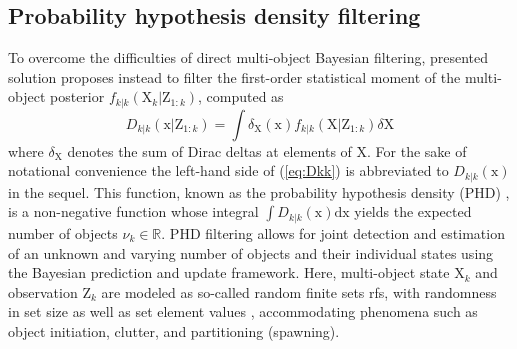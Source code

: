 \subsection{Probability hypothesis density filtering}
\label{ssec:prob-hyp-den}
To overcome the difficulties of direct multi-object Bayesian filtering, presented solution proposes instead to filter the first-order statistical moment of the multi-object posterior $f_{k|k}(\mathrm{X}_{k}|\mathrm{Z}_{1:k})$, computed as
\begin{equation}
D_{k|k}(\mathrm{x}|\mathrm{Z}_{1:k}) = \int\!\delta_{\mathrm{X}}(\mathrm{x})f_{k|k}(\mathrm{X}|\mathrm{Z}_{1:k})\delta\mathrm{X}
\label{eq:Dkk}
\end{equation}
where $\delta_{\mathrm{X}}$ denotes the sum of Dirac deltas at elements of $\mathrm{X}$. For the sake of notational convenience the left-hand side of (\ref{eq:Dkk}) is abbreviated to $D_{k|k}(\mathrm{x})$ in the sequel. This function, known as the probability hypothesis density (PHD) \cite{mahler2003multitarget}, is a non-negative function whose integral $\int\!D_{k|k}(\mathrm{x})\mathrm{d}\mathrm{x}$ yields the expected number of objects $\nu_{k}\in\mathbb{R}$. PHD filtering allows for joint detection and estimation of an unknown and varying number of objects and their individual states using the Bayesian prediction and update framework. Here, multi-object state $\mathrm{X}_k$ and observation $\mathrm{Z}_k$ are modeled as so-called random finite sets \gls{rfs}, with randomness in set size as well as set element values \cite{bar1995multitarget}, accommodating phenomena such as object initiation, clutter, and partitioning (spawning). 

